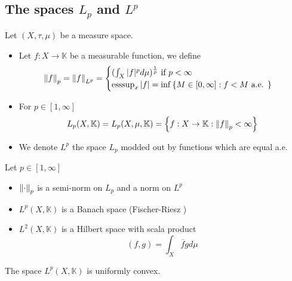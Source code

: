 \documentclass[../main.tex]{subfiles}
\begin{document}
\subsection{The spaces $L_p$ and $L^{p}$ }
\begin{defn}
	Let $( X,\tau,\mu) $ be a measure space.
	\begin{itemize}
	\item Let $f:X\to \mathbb{K}$ be a measurable function, we define
		\[ 
			\left\lVert f\right\rVert_p = \left\lVert f\right\rVert_{L^{p}} = 
			\begin{cases}
				( \int_{ X }^{  }|f|^{p}d\mu)^{\frac{1}{p}} \text{ if } p< \infty \\
				\operatorname{ess sup}_x |f| = \inf \left\{ M \in [ 0, \infty ] : f<M \text{ a.e. }  \right\} 
			\end{cases}
		\]
	
	\item For $p \in [ 1, \infty ] $ 
		\[ 
		L_p( X, \mathbb{K}) = L_p( X,\mu, \mathbb{K})= \left\{ f:X\to \mathbb{K}: \left\lVert f\right\rVert_p < \infty  \right\}  
		\]
	
	\item We denote $L^{p}$ the space $L_p$ modded out by functions which are equal a.e.
	\end{itemize}
	
\end{defn}
\begin{thm}
	Let $p\in [ 1, \infty ] $ 
	\begin{itemize}
		\item $\left\lVert\cdot\right\rVert_p$ is a semi-norm on $L_p$ and a norm on $L^{p}$ 
		\item $L^{p }( X, \mathbb{K}) $ is a Banach space (Fischer-Riesz )  
		\item $L^{2}( X, \mathbb{K}) $ is a Hilbert space with scala product
			\[ 
				( f,g) = \int_{ X }^{  } \overline{f}g d\mu
			\]
			
	\end{itemize}
	
\end{thm}
\begin{lemma}
The space $L^{p}( X, \mathbb{K}) $ is uniformly convex.
\end{lemma}
\end{document}

